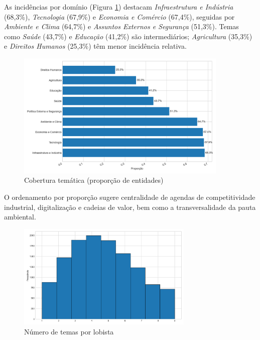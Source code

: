 As incidências por domínio (Figura \ref{fig:theme_coverage}) destacam \textit{Infraestrutura e Indústria} (68,3\%), \textit{Tecnologia} (67,9\%) e \textit{Economia e Comércio} (67,4\%), seguidas por \textit{Ambiente e Clima} (64,7\%) e \textit{Assuntos Externos e Segurança} (51,3\%). Temas como \textit{Saúde} (43,7\%) e \textit{Educação} (41,2\%) são intermediários; \textit{Agricultura} (35,3\%) e \textit{Direitos Humanos} (25,3\%) têm menor incidência relativa.

\begin{figure}[!htbp]
\centering
\includegraphics[width=0.9\textwidth]{figures/theme_coverage.png}
\caption{Cobertura temática (proporção de entidades)}
\label{fig:theme_coverage}
\end{figure}

O ordenamento por proporção sugere centralidade de agendas de competitividade industrial, digitalização e cadeias de valor, bem como a transversalidade da pauta ambiental.


\begin{figure}[!htbp]
\centering
\includegraphics[width=0.75\textwidth]{figures/themes_per_lobbyist_hist.png}
\caption{Número de temas por lobista}
\label{fig:themes_per_lobbyist_hist}
\end{figure}

